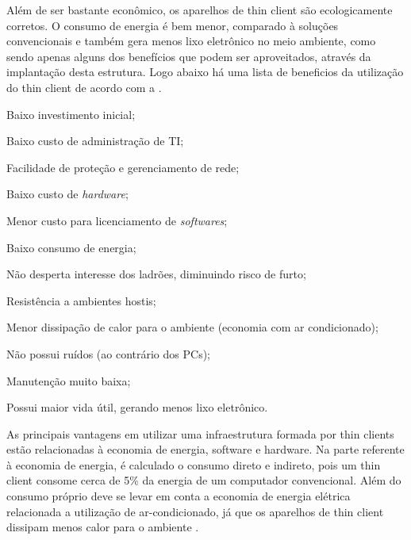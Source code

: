 \documentclass[
	12pt,				%
	openright,			%
	twoside,			%
	a4paper,			%
	chapter=TITLE,		%
	english,			%
	brazil				%
	]{abntex2}
\begin{document}
Além de ser bastante econômico, os aparelhos de thin client são ecologicamente corretos. O consumo de energia é bem menor, comparado à soluções convencionais e também gera menos lixo eletrônico no meio ambiente, como sendo apenas alguns dos benefícios que podem ser aproveitados, através da implantação desta estrutura. Logo abaixo há uma lista de beneficios da utilização do thin client de acordo com a .

\begin{alineas}
\item Baixo investimento inicial;
\item Baixo custo de administração de TI;
\item Facilidade de proteção e gerenciamento de rede;
\item Baixo custo de \textit{hardware};
\item Menor custo para licenciamento de \textit{softwares};
\item Baixo consumo de energia;
\item Não desperta interesse dos ladrões, diminuindo risco de furto;
\item Resistência a ambientes hostis;
\item Menor dissipação de calor para o ambiente (economia com ar condicionado);
\item Não possui ruídos (ao contrário dos PCs);
\item Manutenção muito baixa;
\item Possui maior vida útil, gerando menos lixo eletrônico.
\end{alineas}

As principais vantagens em utilizar uma infraestrutura formada por thin clients estão relacionadas à economia de energia, software e hardware. Na parte referente à economia de energia, é calculado o consumo direto e indireto, pois um thin client consome cerca de 5\% da energia de um computador convencional. Além do consumo próprio deve se levar em conta a economia de energia elétrica relacionada a utilização de ar-condicionado, já que os aparelhos de thin client dissipam menos calor para o ambiente \cite{EmailThinClient}.
	 

\begin{table}[h!]
\end{table}
\end{document}

